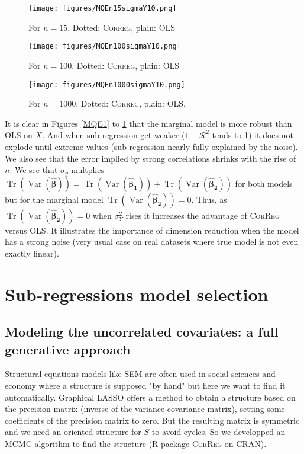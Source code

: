 \documentclass[11pt,a4paper]{article}
\begin{document}
\begin{figure}[h!]
	\begin{minipage}[l]{.32\linewidth}
			\texttt{[image: figures/MQEn15sigmaY10.png]} 
			\caption{For $n=15$. Dotted: \textsc{Correg}, plain: OLS}\label{MQE1}
	\end{minipage} \hfill
	\begin{minipage}[c]{.32\linewidth}
			\texttt{[image: figures/MQEn100sigmaY10.png]} 
			\caption{For $n=100$. Dotted: \textsc{Correg}, plain: OLS}
	\end{minipage} \hfill
   \begin{minipage}[r]{.32\linewidth}
			\texttt{[image: figures/MQEn1000sigmaY10.png]} 
			\caption{For $n=1000$. Dotted: \textsc{Correg}, plain: OLS.} \label{MQE3}
   \end{minipage} 
\end{figure} 
It is clear in Figures \ref{MQE1} to \ref{MQE3} that the marginal model is more robust than \textsc{OLS} on $X$. And when sub-regression get weaker ($1-\mathcal{R}^2$ tends to 1) it does not explode until extreme values (sub-regression nearly fully explained by the noise). We also see that the error implied by strong correlations shrinks with the rise of $n$. 
We see that $\sigma_y$ multplies $\operatorname{Tr}(\operatorname{Var}(\boldsymbol{\hat{\beta}}))=\operatorname{Tr}(\operatorname{Var}(\boldsymbol{\hat{\beta}_{1}}))+\operatorname{Tr}(\operatorname{Var}(\boldsymbol{\hat{\beta}_{2}}))$ for both models but for the marginal model $\operatorname{Tr}(\operatorname{Var}(\boldsymbol{\hat{\beta}_{2}}))=0$.
 Thus, as $\operatorname{Tr}(\operatorname{Var}(\boldsymbol{\hat{\beta}_{2}}))=0$ when $\sigma_Y^2$ rises it increases the advantage of \textsc{CorReg} versus \textsc{OLS}. It illustrates the importance of dimension reduction when the model has a strong noise (very usual case on real datasets where true model is not even exactly linear).

	
\section{Sub-regressions model selection}	
	\subsection{Modeling the uncorrelated covariates: a full generative approach}
Structural equations models like \textsc{SEM} are often used in social sciences and economy where a structure is supposed "by hand" but here we want to find it automatically. Graphical LASSO \cite{friedman2008sparse} offers a method to obtain a structure based on the precision matrix (inverse of the variance-covariance matrix), setting some coefficients of the precision matrix to zero. But the resulting matrix is symmetric and we need an oriented structure for $S$ to avoid cycles. So we developped an MCMC algorithm to find the structure (R package \textsc{CorReg} on CRAN). 
	
\end{document}
